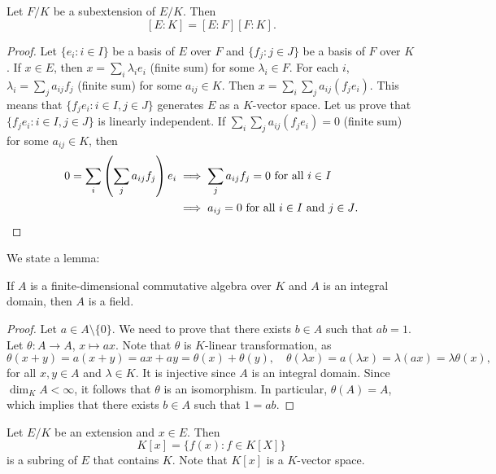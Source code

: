 \begin{proposition}
\label{pro:multiplicativity of degree}
	Let $F/K$ be a subextension of $E/K$. Then
	\[
	[E:K]=[E:F][F:K].
	\]
\end{proposition}

\begin{proof}
	Let $\{e_i:i\in I\}$ be a basis of $E$ over $F$
	and $\{f_j:j\in J\}$ be a basis of $F$ over $K$. If $x\in E$,
	then $x=\sum_i \lambda_ie_i$ (finite sum) 
	for some $\lambda_i\in F$. For each $i$, 
	$\lambda_i=\sum_j a_{ij}f_j$ (finite sum)
	for some $a_{ij}\in K$. Then 
	$x=\sum_i\sum_j a_{ij}(f_je_i)$. This means
	that $\{f_je_i:i\in I,j\in J\}$ generates
	$E$ as a $K$-vector space. Let us prove that 
	$\{f_je_i:i\in I,j\in J\}$
	is linearly independent. If $\sum_i\sum_j a_{ij}(f_je_i)=0$ (finite sum)
	for some $a_{ij}\in K$, 
	then
	\begin{align*}
		0=\sum_i\left(\sum_j a_{ij}f_j\right)e_i&\implies
		\sum_j a_{ij}f_j=0\text{ for all $i\in I$}\\
		&\implies 
		a_{ij}=0\text{ for all $i\in I$ and $j\in J$}.\qedhere
	\end{align*}
\end{proof}

We state a lemma:

\begin{lemma}
If $A$ is a finite-dimensional commutative algebra over $K$ 
and $A$ is an integral domain, then $A$ is a field. 
\end{lemma}

\begin{proof}
	Let $a\in A\setminus\{0\}$. We need to prove that there exists $b\in A$
	such that $ab=1$. Let $\theta\colon A\to A$, $x\mapsto ax$. Note that 
	$\theta$ is $K$-linear transformation, as 
    \[
    \theta(x+y)=a(x+y)=ax+ay=\theta(x)+\theta(y),\quad
    \theta(\lambda x)=a(\lambda x)=\lambda (ax)=\lambda\theta(x),
    \]
    for all $x,y\in A$ and $\lambda\in K$. 
 It is injective since $A$ is an
	integral domain.  Since $\dim_KA<\infty$, it follows that $\theta$ is an
	isomorphism. In particular, $\theta(A)=A$, which implies that there exists
	$b\in A$ such that $1=ab$. 
\end{proof}

Let $E/K$ be an extension and $x\in E$. 
Then 
\[
K[x]=\{f(x): f\in K[X]\}
\]
is a subring of $E$ that contains $K$. Note that 
$K[x]$ is a $K$-vector space. 

